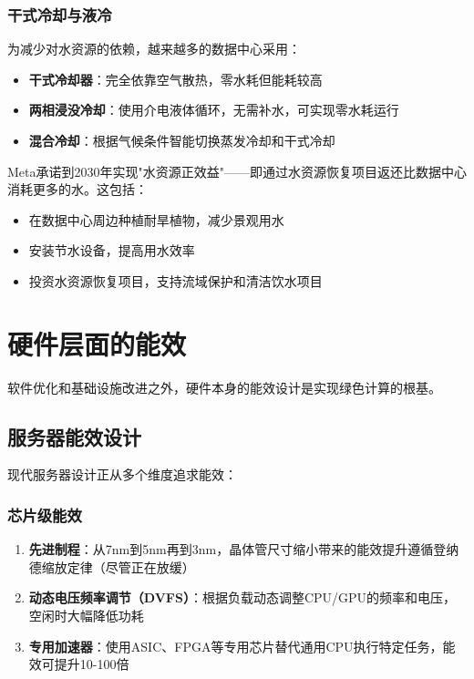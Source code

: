 \subsubsection{干式冷却与液冷}

为减少对水资源的依赖，越来越多的数据中心采用：
\begin{itemize}
    \item \textbf{干式冷却器}：完全依靠空气散热，零水耗但能耗较高
    \item \textbf{两相浸没冷却}：使用介电液体循环，无需补水，可实现零水耗运行
    \item \textbf{混合冷却}：根据气候条件智能切换蒸发冷却和干式冷却
\end{itemize}

Meta承诺到2030年实现"水资源正效益"——即通过水资源恢复项目返还比数据中心消耗更多的水。这包括：
\begin{itemize}
    \item 在数据中心周边种植耐旱植物，减少景观用水
    \item 安装节水设备，提高用水效率
    \item 投资水资源恢复项目，支持流域保护和清洁饮水项目
\end{itemize}

\section{硬件层面的能效}\label{sec:hardware-efficiency}

软件优化和基础设施改进之外，硬件本身的能效设计是实现绿色计算的根基。

\subsection{服务器能效设计}

现代服务器设计正从多个维度追求能效：

\subsubsection{芯片级能效}

\begin{enumerate}
    \item \textbf{先进制程}：从7nm到5nm再到3nm，晶体管尺寸缩小带来的能效提升遵循登纳德缩放定律（尽管正在放缓）
    \item \textbf{动态电压频率调节（DVFS）}：根据负载动态调整CPU/GPU的频率和电压，空闲时大幅降低功耗
    \item \textbf{专用加速器}：使用ASIC、FPGA等专用芯片替代通用CPU执行特定任务，能效可提升10-100倍
\end{enumerate}

